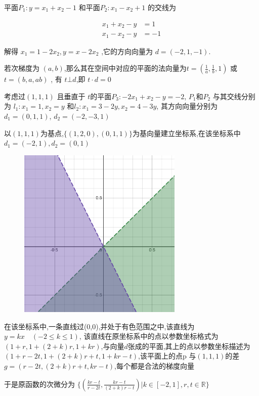 \documentclass[a4paper]{article}
\begin{document}
平面\(P_1 : y = x_1 + x_2 - 1\) 和平面\(P_2 : x_1 - x_2 + 1\) 的交线为

\[ \begin{aligned}
    x_1 + x_2 - y & = 1 \\
    x_1 - x_2 - y & = -1
\end{aligned}\]

解得 \( x_1 = 1-2x_2, y = x-2x_2\) ,它的方向向量为 \(d= (-2,1,-1)\).

若次梯度为 \((a,b)\),那么其在空间中对应的平面的法向量为\( t = (\frac{1}{a},\frac{1}{b},1)\) 或\(t = (b,a,ab)\) , 有 \(t \bot d\),即 \(t \cdot d = 0\)

考虑过$(1,1,1)$ 且垂直于 $t$的平面$P_3: -2x_1 +x_2 - y = -2$, $P_1$和$P_2$ 与其交线分别为 
$l_1 : x_1 = 1,x_2 = y$ 和$l_2 : x_1 = 3-2y,x_2 = 4-3y$,   其方向向量分别为 $d_1 = (0,1,1)$, $d_2 = (-2,-3,1)$

以$(1,1,1)$为基点,$\{(1,2,0),(0,1,1)\}$为基向量建立坐标系,在该坐标系中$d_1 = (-2,1),d_2 = (0,1)$

\begin{figure}[H]
    \centering
    \includegraphics[width=0.7\textwidth]{pic/p5s3.png}
\end{figure}

在该坐标系中,一条直线过(0,0),并处于有色范围之中,该直线为 $y = kx \quad (-2 \leq k \leq 1)$, 该直线在原坐标系中的点以参数坐标格式为$(1+r,1+(2+k)r,1+kr)$,与向量$d$张成的平面,其上的点以参数坐标描述为 $(1+r - 2t,1+ (2+k)r +t, 1+kr-t)$,该平面上的点p 与$(1,1,1)$的差 $g = (r - 2t,(2+k)r + t , kr-t)$,每个都是合法的梯度向量

于是原函数的次微分为 \(\{(\frac{kr-t}{r-2t},\frac{kr-t}{(2+k)r-t}) | k \in [-2,1], r,t \in \mathbb{R}\}\)
\end{document}
